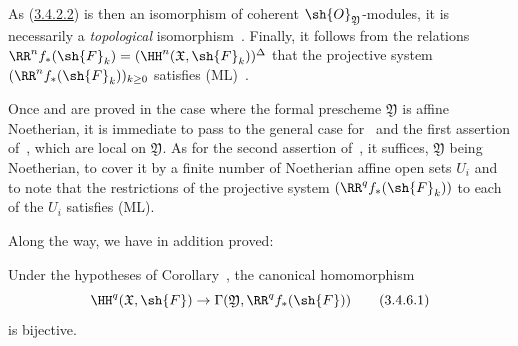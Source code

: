 \begin{env}[3.4.5]
As (\hyperref[III.3.4.2.2]{3.4.2.2}) is then an isomorphism of coherent $\sh{O}_\mathfrak{Y}$-modules, it is necessarily a \emph{topological} isomorphism~.
Finally, it follows from the relations $\RR^n f_*(\sh{F}_k)=(\HH^n(\mathfrak{X},\sh{F}_k))^\Delta$ that the projective system $(\RR^n f_*(\sh{F}_k))_{k\geq 0}$ satisfies (ML)~.

Once  and  are proved in the case where the formal prescheme $\mathfrak{Y}$ is affine Noetherian, it is immediate to pass to the general case for~ and the first assertion of~, which are local on $\mathfrak{Y}$.
As for the second assertion of~, it suffices, $\mathfrak{Y}$ being Noetherian, to cover it by a finite number of Noetherian affine open sets $U_i$ and to note that the restrictions of the projective system $(\RR^q f_*(\sh{F}_k))$ to each of the $U_i$ satisfies (ML).
\end{env}

Along the way, we have in addition proved:
\begin{corollary}[3.4.6]
\label{III.3.4.6}
Under the hypotheses of Corollary~, the canonical homomorphism
\[
\label{III.3.4.6.1}
  \HH^q(\mathfrak{X},\sh{F})\to\Gamma(\mathfrak{Y},\RR^q f_*(\sh{F}))
  \tag{3.4.6.1}
\]
is bijective.
\end{corollary}
